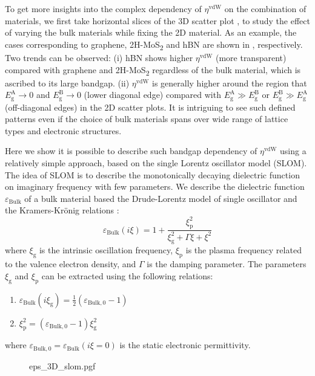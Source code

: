 To get more insights into the complex dependency of
\(\eta^{\mathrm{vdW}}\) on the combination of materials, we first take
horizontal slices of the 3D scatter plot , to
study the effect of varying the bulk materials while fixing the 2D
material.
%
As an example, the cases corresponding to graphene,
2H-MoS\textsubscript{2} and hBN are shown in , respectively.
%
Two trends can be observed: (i) hBN shows higher $\eta^{\mathrm{vdW}}$
(more transparent) compared with graphene and 2H-MoS\textsubscript{2}
regardless of the bulk material, which is ascribed to its large
bandgap. (ii) $\eta^{\mathrm{vdW}}$ is generally higher around the
region that \(E_{\mathrm{g}}^{\mathrm{A}} \to 0\) and
\(E_{\mathrm{g}}^{\mathrm{B}} \to 0\) (lower diagonal edge) compared
with \(E_{\mathrm{g}}^{\mathrm{A}} \gg E_{\mathrm{g}}^{\mathrm{B}}\)
or \(E_{\mathrm{g}}^{\mathrm{B}} \gg E_{\mathrm{g}}^{\mathrm{A}}\)
(off-diagonal edges) in the 2D scatter plots.
%
It is intriguing to see such defined patterns even
if the choice of bulk materials spans over wide range of lattice types
and electronic structures.

Here we show it is possible to describe such bandgap dependency of
$\eta^{\mathrm{vdW}}$ using a relatively simple approach, based on the
single Lorentz oscillator model (SLOM).
%
The idea of SLOM is to describe the monotonically decaying dielectric
function on imaginary frequency with few parameters. We describe the
dielectric function $\varepsilon_{\mathrm{Bulk}}$ of a bulk material
based the Drude-Lorentz model of single oscillator and the Kramers-Krönig relations :
\begin{equation}
\label{eq:vdw-lorentz-imag}
\varepsilon_{\mathrm{Bulk}}(i \xi) 
=
1 + \frac{\xi_{\mathrm{p}}^{2}}{\xi_{\mathrm{g}}^{2} + \Gamma \xi + \xi^{2}}
\end{equation}
 where 
\(\xi_{\mathrm{g}}\) is the intrinsic oscillation frequency,
\(\xi_{\mathrm{p}}\) is the plasma frequency related to the valence
electron density, and \(\Gamma\) is the damping parameter.
The parameters \(\xi_{\mathrm{g}}\) and \(\xi_{\mathrm{p}}\) can
be extracted using the following relations:
\begin{enumerate}
\item \(\varepsilon_{\mathrm{Bulk}}(i \xi_{\mathrm{g}}) = \frac{1}{2} (\varepsilon_{\mathrm{Bulk, 0}} - 1)\)
\item \(\xi_{\mathrm{p}}^{2} = (\varepsilon_{\mathrm{Bulk, 0}} - 1) \xi_{\mathrm{g}}^{2}\)
\end{enumerate}
where
$\varepsilon_{\mathrm{Bulk, 0}} = \varepsilon_{\mathrm{Bulk}}(i\xi =
0)$ is the static electronic permittivity.
%
\begin{figure}[h]
  \centering{}
  {eps_3D_slom.pgf}
  \caption{\label{fig:vdw-slom-param}}
\end{figure}

